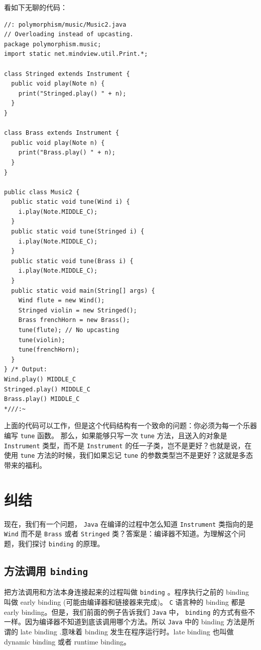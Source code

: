 \documentclass[10pt,a4paper,UTF8]{article}
\begin{document}
看如下无聊的代码：
\lstset{language=C,label= ,caption= ,captionpos=b,firstnumber=1,numbers=left}
\begin{lstlisting}
//: polymorphism/music/Music2.java
// Overloading instead of upcasting.
package polymorphism.music;
import static net.mindview.util.Print.*;

class Stringed extends Instrument {
  public void play(Note n) {
    print("Stringed.play() " + n);
  }
}

class Brass extends Instrument {
  public void play(Note n) {
    print("Brass.play() " + n);
  }
}

public class Music2 {
  public static void tune(Wind i) {
    i.play(Note.MIDDLE_C);
  }
  public static void tune(Stringed i) {
    i.play(Note.MIDDLE_C);
  }
  public static void tune(Brass i) {
    i.play(Note.MIDDLE_C);
  }
  public static void main(String[] args) {
    Wind flute = new Wind();
    Stringed violin = new Stringed();
    Brass frenchHorn = new Brass();
    tune(flute); // No upcasting
    tune(violin);
    tune(frenchHorn);
  }
} /* Output:
Wind.play() MIDDLE_C
Stringed.play() MIDDLE_C
Brass.play() MIDDLE_C
*///:~
\end{lstlisting}
上面的代码可以工作，但是这个代码结构有一个致命的问题：你必须为每一个乐器编写 \texttt{tune} 函数。 那么，如果能够只写一次 \texttt{tune} 方法，且送入的对象是 \texttt{Instrument} 类型，而不是 \texttt{Instrument} 的任一子类，岂不是更好？也就是说，在使用 \texttt{tune} 方法的时候，我们如果忘记 \texttt{tune} 的参数类型岂不是更好？这就是多态带来的福利。
\section{纠结}
\label{sec:org9adbf17}


现在，我们有一个问题， \texttt{Java} 在编译的过程中怎么知道 \texttt{Instrument} 类指向的是 \texttt{Wind} 而不是 \texttt{Brass} 或者 \texttt{Stringed} 类？答案是：编译器不知道。为理解这个问题，我们探讨 \texttt{binding} 的原理。

\subsection{方法调用 \texttt{binding}}
\label{sec:org9e01083}

把方法调用和方法本身连接起来的过程叫做 \texttt{binding} 。程序执行之前的 binding 叫做 early binding (可能由编译器和链接器来完成)。 \texttt{C} 语言种的 binding 都是 early binding。但是，我们前面的例子告诉我们 \texttt{Java} 中， \texttt{binding} 的方式有些不一样。因为编译器不知道到底该调用哪个方法。所以 \texttt{Java} 中的 binding 方法是所谓的 late binding .意味着 binding 发生在程序运行时。late binding 也叫做 dynamic binding 或者 runtime binding。
\end{document}
